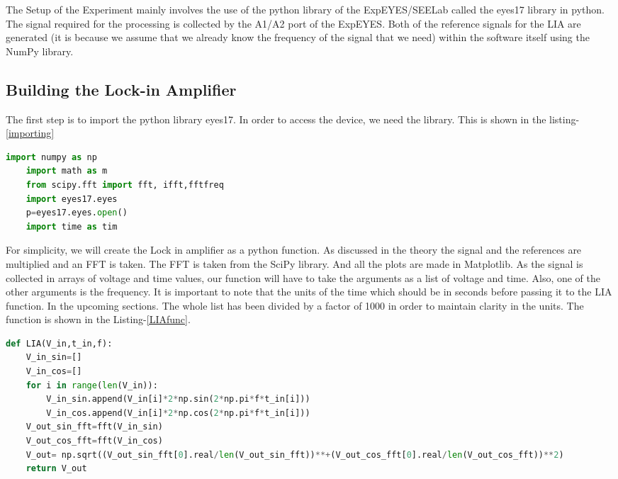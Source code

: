 \documentclass{article}
\begin{document}
\begin{multicols}{2}
The Setup of the Experiment mainly involves the use of the python library of the ExpEYES/SEELab called the eyes17 library in python. The signal required for the processing is collected by the A1/A2 port of the ExpEYES. Both of the reference signals for the LIA are generated (it is because we assume that we already know the frequency of the signal that we need) within the software itself using the NumPy library.


\subsection{Building the Lock-in Amplifier}

The first step is to import the python library eyes17. In order to access the device, we need the library. This is shown in the listing-\ref{importing}


\begin{lstlisting}[language=Python, caption=importing the libraries-\cite{harris2020array}-\cite{2020SciPy-NMeth}-\cite{Hunter:2007}-\cite{csparkresearch},label=importing]
    import numpy as np
    import math as m
    from scipy.fft import fft, ifft,fftfreq
    import eyes17.eyes
    p=eyes17.eyes.open()
    import time as tim    
\end{lstlisting}


For simplicity, we will create the Lock in amplifier as a python function. As discussed in the theory the signal and the references are multiplied and an FFT is taken. The FFT is taken from the SciPy library. And all the plots are made in Matplotlib. As the signal is collected in arrays of voltage and time values, our function will have to take the arguments as a list of voltage and time. Also, one of the other arguments is the frequency. It is important to note that the units of the time which should be in seconds before passing it to the LIA function. In the upcoming sections. The whole list has been divided by a factor of 1000 in order to maintain clarity in the units. The function is shown in the Listing-\ref{LIAfunc}.


\begin{lstlisting}[language=Python, caption=Defining the Lock-In-Amplifier Function,label=LIAfunc]
def LIA(V_in,t_in,f):
    V_in_sin=[]         
    V_in_cos=[]                      
    for i in range(len(V_in)):      
        V_in_sin.append(V_in[i]*2*np.sin(2*np.pi*f*t_in[i]))
        V_in_cos.append(V_in[i]*2*np.cos(2*np.pi*f*t_in[i]))
    V_out_sin_fft=fft(V_in_sin)
    V_out_cos_fft=fft(V_in_cos)
    V_out= np.sqrt((V_out_sin_fft[0].real/len(V_out_sin_fft))**+(V_out_cos_fft[0].real/len(V_out_cos_fft))**2)
    return V_out
\end{lstlisting}



\end{multicols}
\end{document}
